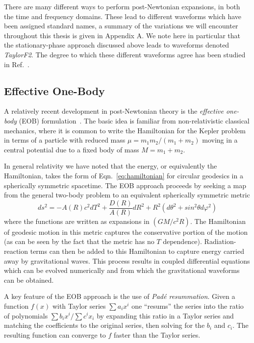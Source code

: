 There are many different ways to perform post-Newtonian expansions, in
both the time and frequency domains.  These lead to different
waveforms which have been assigned standard names, a summary of the
variations we will encounter throughout this thesis is given in
Appendix A.  We note here in particular that the stationary-phase
approach discussed above leads to waveforms denoted \emph{TaylorF2}.
The degree to which these different waveforms agree has been studied in
Ref.~\cite{BuonannoIyerOchsnerYiSathya2009}. 


\subsection{Effective One-Body}
\label{ssec:EOB}

A relatively recent development in post-Newtonian theory is the
\emph{effective one-body} (EOB)
formulation~\cite{BuonannoDamour:1999}.  The basic idea is familiar
from non-relativistic classical mechanics, where it is common to write
the Hamiltonian for the Kepler problem in terms of a particle with
reduced mass $\mu = m_1m_2 /(m_1 + m_2)$ moving in a central potential
due to a fixed body of mass $M = m_1 + m_2$.  

In general relativity we have noted that the energy, or equivalently
the Hamiltonian, takes the form of Eqn.~\ref{eq:hamiltonian} for
circular geodesics in a spherically symmetric spacetime.  The EOB
approach proceeds by seeking a map from the general two-body problem
to an equivalent spherically symmetric metric
%
\begin{equation}
ds^2 = -A(R) c^2 dT^2 + \frac{D(R)}{A(R)} dR^2 + R^2(d\theta^2 + sin^2 \theta
d\varphi^2)
\end{equation}
%
where the functions are written as expansions in $(GM/c^2R)$.  The
Hamiltonian of geodesic motion in this metric captures the
conservative portion of the motion (as can be seen by the fact that
the metric has no $T$ dependence).  Radiation-reaction terms can then
be added to this Hamiltonian to capture energy carried away by
gravitational waves.  This process results in coupled differential
equations which can be evolved numerically and from which the
gravitational waveforms can be obtained.

A key feature of the EOB approach is the use of \emph{Pad\'{e}
resummation}.  Given a function $f(x)$ with Taylor series $\sum a_i
x^i$ one ``resums'' the series into the ratio of polynomials $\sum b_i
x^i/\sum c^i x_i$ by expanding this ratio in a Taylor series and
matching the coefficients to the original series, then solving for the
$b_i$ and $c_i$.  The resulting function can converge to $f$ faster
than the Taylor series.

